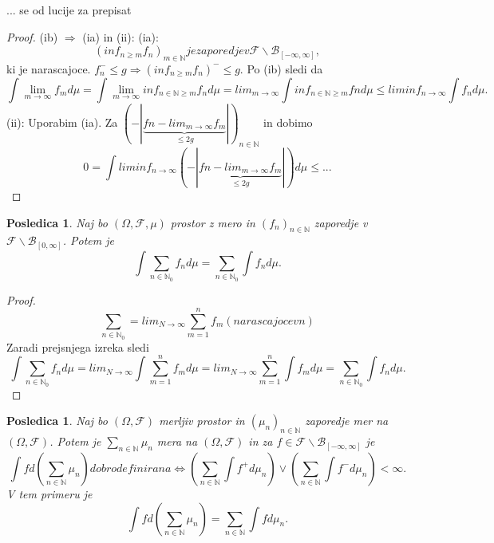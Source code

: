 \documentclass[a4paper,12pt]{article}
\theoremstyle{definition} %
\theoremstyle{plain} %
\newtheorem{posledica}[definicija]{Posledica}
\newcommand{\N}{\mathbb{N}}
\newcommand{\F}{\mathcal{F}}
\begin{document}
            ... se od lucije za prepisat

            \begin{proof}
                (ib) $\Rightarrow$ (ia) in (ii):
                (ia):
                $$
                    \left(inf_{n \geq m} f_n\right)_{m \in \N} je zaporedje v \F\backslash\mathcal{B}_{[-\infty, \infty]},
                $$
                ki je narascajoce. $f_n^- \leq g \Rightarrow \left(inf_{n \geq m} f_n\right)^- \leq g$. Po (ib) sledi da 
                $$
                    \int \lim_{m \rightarrow \infty}f_m d\mu =  \int \lim_{m \rightarrow \infty} inf_{n \in \N \geq m} f_n d\mu
                    = lim_{m \rightarrow \infty} \int inf_{n \in \N \geq m} fn d\mu \leq liminf_{n \rightarrow \infty} \int f_n d\mu.
                $$
                (ii):
                Uporabim (ia). Za $\left(- |\underbrace{fn - lim_{m\rightarrow \infty} f_m}_{\leq 2g}|\right)_{n \in \N}$ in dobimo 
                $$
                    0 = \int liminf_{n \rightarrow \infty} \left(- |\underbrace{fn - lim_{m\rightarrow \infty} f_m}_{\leq 2g}|\right) d\mu
                    \leq ...
                $$
            \end{proof}

            \begin{posledica}
                Naj bo $(\Omega, \F, \mu)$ prostor z mero in $(f_n)_{n \in \N}$ zaporedje v $\F\backslash\mathcal{B}_{[0, \infty]}$.
                Potem je 
                $$
                    \int \sum_{n \in \N_0}f_n d\mu = \sum_{n \in \N_0}\int f_n d\mu.
                $$
            \end{posledica}

            \begin{proof}
                $$
                    \sum_{n \in \N_0} = lim_{N \rightarrow \infty}\sum_{m = 1}^n f_m (narascajoce v n)
                $$
                Zaradi prejsnjega izreka sledi
                $$
                    \int \sum_{n \in \N_0}f_n d\mu = lim_{N \rightarrow \infty}\int \sum_{m = 1}^n f_m d\mu = 
                    lim_{N \rightarrow \infty}\sum_{m = 1}^n \int f_m d\mu = \sum_{n \in \N_0}\int f_n d\mu.
                $$
            \end{proof}
            
            \begin{posledica}
                Naj bo $(\Omega, \F)$ merljiv prostor in $(\mu_n)_{n \in \N}$ zaporedje mer na $(\Omega, \F)$. Potem je 
                $\sum_{n \in \N}\mu_n$ mera na $(\Omega, \F)$ in za $f \in \F\backslash\mathcal{B}_{[-\infty, \infty]}$ je
                $$
                    \int fd\left(\sum_{n \in \N}\mu_n\right) dobro definirana \iff 
                    \left( \sum_{n \in \N}\int f^+d\mu_n\right) \vee \left(\sum_{n \in \N}\int f^-d\mu_n\right) < \infty.
                $$
                V tem primeru je 
                $$
                    \int f d(\sum_{n \in \N}\mu_n) = \sum_{n \in \N}\int fd\mu_n.
                $$
            \end{posledica}
\end{document}
